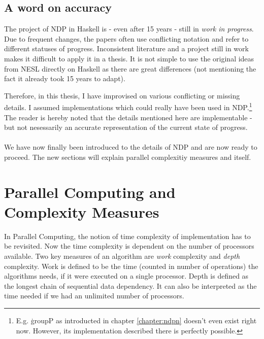   \subsection{A word on accuracy}
    The project of NDP in Haskell is - even after 15 years -
    still in \textit{work in progress}. Due to frequent changes,
    the papers often use conflicting notation and refer to
    different statuses of progress. Inconsistent literature and a project still in work makes it difficult
    to apply it in a thesis. It is not simple to use the original ideas from
    NESL directly on Haskell as there are great differences (not mentioning
    the fact it already took 15 years to adapt).
    
    Therefore, in this thesis, I have improvised on various conflicting or
    missing details. I assumed implementations which could really have been
    used in NDP.\footnote{E.g. \c{groupP} as introducted in chapter \ref{chapter:ndpn} doesn't
    even exist right now. However, its implementation described there is perfectly possible.}
    The reader is hereby noted that the details
    mentioned here are implementable - but not nesessarily an accurate
    representation of the current state of progress.
    
    
  \paragraph{}
    We have now finally been introduced to the details of NDP and
    are now ready to proceed. The new sections will explain
    parallel complexitiy measures and \algo itself.
  
  \clearpage
  
\section{Parallel Computing and Complexity Measures}
  \label{section:parmeasures}
  In Parallel Computing, the notion of time complexity of implementation
  has to be revisited. Now the time complexity is dependent on the
  number of processors available. Two key measures of
  an algorithm are \emph{work} complexity
  and \emph{depth} complexity. Work is defined
  to be the time (counted in number of operations)
  the algorithms needs, if it were executed on a single processor.
  Depth is defined as the longest chain of sequential data dependency.
  It can also be interpreted as the time needed if we had
  an unlimited number of processors.
  
